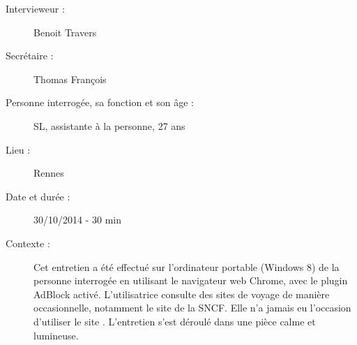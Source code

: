 \begin{description}
\item [Intervieweur :] Benoit Travers
\item [Secr\'{e}taire :] Thomas Fran\c{c}ois
\item [Personne interrog\'{e}e, sa fonction et son \^{a}ge :] SL, assistante \`{a} la personne, 27 ans
\item [Lieu :] Rennes
\item [Date et dur\'{e}e :] 30/10/2014 - 30 min
\item [Contexte :] Cet entretien a \'{e}t\'{e} effectu\'{e} sur l'ordinateur portable (Windows 8) de la personne interrog\'{e}e en utilisant le navigateur web Chrome, avec le plugin AdBlock activ\'{e}. L'utilisatrice consulte des sites de voyage de mani\`{e}re occasionnelle, notamment le site de la SNCF. Elle n'a jamais eu l'occasion d'utiliser le site \kel. L'entretien s'est d\'{e}roul\'{e} dans une pi\`{e}ce calme et lumineuse. 
\end{description}


